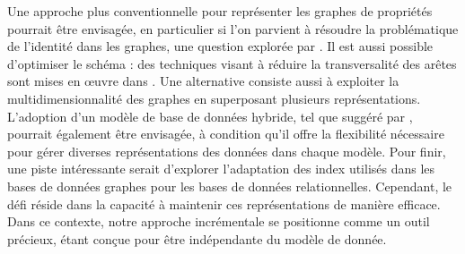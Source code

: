 Une approche plus conventionnelle pour représenter les graphes de propriétés pourrait être envisagée, en particulier si l'on parvient à résoudre la problématique de l'identité dans les graphes, une question explorée par \cite{fanDependenciesGraphs2019}.
Il est aussi possible d'optimiser le schéma : des techniques visant à réduire la transversalité des arêtes sont mises en œuvre dans \cite{alotaibiPropertyGraphSchema2021}.
Une alternative consiste aussi à exploiter la multidimensionnalité des graphes en superposant plusieurs représentations.
L'adoption d'un modèle de base de données hybride, tel que suggéré par \cite{hassanGRFusionGraphsFirstClass2018}, pourrait également être envisagée, à condition qu'il offre la flexibilité nécessaire pour gérer diverses représentations des données dans chaque modèle.
Pour finir, une piste intéressante serait d'explorer l'adaptation des index utilisés dans les bases de données graphes pour les bases de données relationnelles.
Cependant, le défi réside dans la capacité à maintenir ces représentations de manière efficace.
Dans ce contexte, notre approche incrémentale se positionne comme un outil précieux, étant conçue pour être indépendante du modèle de donnée.
